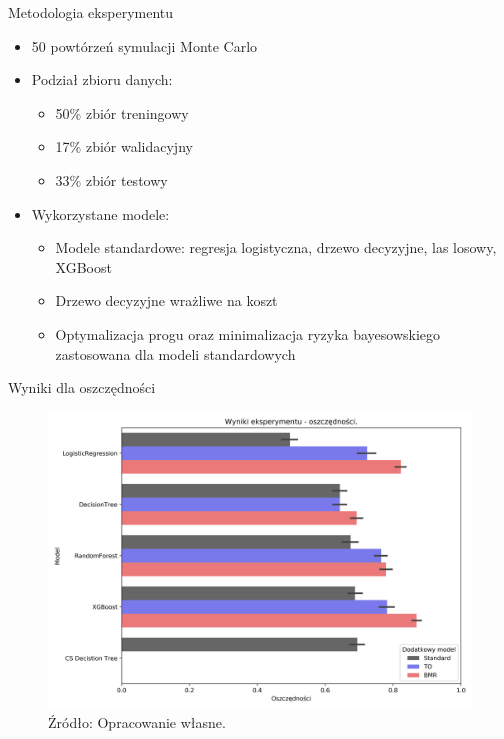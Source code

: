 \documentclass{beamer}
\begin{document}
\begin{frame}{Metodologia eksperymentu}
	\begin{itemize}
		\item 50 powtórzeń symulacji Monte Carlo 
		\item Podział zbioru danych:
		\begin{itemize}
			\item 50\% zbiór treningowy
			\item 17\% zbiór walidacyjny
			\item 33\% zbiór testowy
		\end{itemize}
		\item Wykorzystane modele:
		\begin{itemize}
			\item Modele standardowe: regresja logistyczna, drzewo decyzyjne, las losowy, XGBoost
			\item Drzewo decyzyjne wrażliwe na koszt
			\item Optymalizacja progu oraz minimalizacja ryzyka bayesowskiego zastosowana dla modeli standardowych
		\end{itemize}
	\end{itemize}
\end{frame}

\begin{frame}{Wyniki dla oszczędności}
	\begin{figure}
		\includegraphics[width=0.8\linewidth]{images/100_config1-Savings.png}
		\caption{Źródło: Opracowanie własne.}
	\end{figure}
\end{frame}
\end{document}
